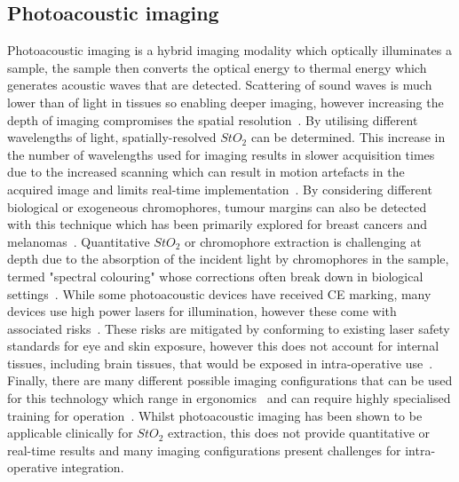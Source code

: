 \subsection{Photoacoustic imaging}
Photoacoustic imaging is a hybrid imaging modality which optically illuminates a sample, the sample then converts the optical energy to thermal energy which generates acoustic waves that are detected. Scattering of sound waves is much lower than of light in tissues so enabling deeper imaging, however increasing the depth of imaging compromises the spatial resolution~\citep{Assi2023}. By utilising different wavelengths of light, spatially-resolved $StO_2$ can be determined. This increase in the number of wavelengths used for imaging results in slower acquisition times due to the increased scanning which can result in motion artefacts in the acquired image and limits real-time implementation~\citep{Assi2023, Attia2019}. By considering different biological or exogeneous chromophores, tumour margins can also be detected with this technique which has been primarily explored for breast cancers and melanomas~\citep{Assi2023, Attia2019, Taylor-Williams2022}. Quantitative $StO_2$ or chromophore extraction is challenging at depth due to the absorption of the incident light by chromophores in the sample, termed "spectral colouring" whose corrections often break down in biological settings~\citep{Assi2023, Taylor-Williams2022}. While some photoacoustic devices have received CE marking, many devices use high power lasers for illumination, however these come with associated risks~\citep{Assi2023}. These risks are mitigated by conforming to existing laser safety standards for eye and skin exposure, however this does not account for internal tissues, including brain tissues, that would be exposed in intra-operative use~\citep{Assi2023}. Finally, there are many different possible imaging configurations that can be used for this technology which range in ergonomics~\citep{Attia2019} and can require highly specialised training for operation~\citep{Assi2023}. Whilst photoacoustic imaging has been shown to be applicable clinically for $StO_2$ extraction, this does not provide quantitative or real-time results and many imaging configurations present challenges for intra-operative integration. 

